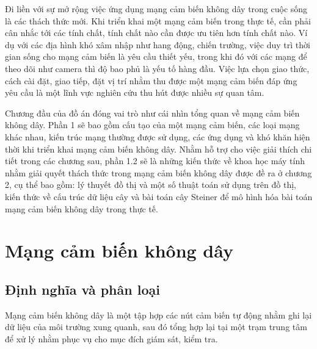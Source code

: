 Đi liền với sự mở rộng việc ứng dụng mạng cảm biến không dây trong cuộc sống là các thách thức mới. Khi triển khai một mạng cảm biến trong thực tế, cần phải cân nhắc tới các tính chất, tính chất nào cần được ưu tiên hơn tính chất nào. Ví dụ với các địa hình khó xâm nhập như hang động, chiến trường, việc duy trì thời gian sống cho mạng cảm biến là yêu cầu thiết yếu, trong khi đó với các mạng để theo dõi như camera thì độ bao phủ là yếu tố hàng đầu. Việc lựa chọn giao thức, cách cài đặt, giao tiếp, đặt vị trí nhằm thu được một mạng cảm biến đáp ứng yêu cầu là một lĩnh vực nghiên cứu thu hút được nhiều sự quan tâm.

 
Chương đầu của đồ án đóng vai trò như cái nhìn tổng quan về mạng cảm biến không dây. Phần 1 sẽ bao gồm cấu tạo của một mạng cảm biến, các loại mạng khác nhau, kiến trúc mạng thường được sử dụng, các ứng dụng và khó khăn hiện thời khi triển khai mạng cảm biến không dây. Nhằm hỗ trợ cho việc giải thích chi tiết trong các chương sau, phần 1.2 sẽ là những kiến thức về khoa học máy tính nhằm giải quyết thách thức trong mạng cảm biến không dây được đề ra ở chương 2, cụ thể bao gồm: lý thuyết đồ thị và một số thuật toán sử dụng trên đồ thị, kiến thức về cấu trúc dữ liệu cây và bài toán cây Steiner để mô hình hóa bài toán mạng cảm biến không dây trong thực tế.

\section{Mạng cảm biến không dây}
\subsection{Định nghĩa và phân loại}
Mạng cảm biến không dây là một tập hợp các nút cảm biến tự động nhằm ghi lại dữ liệu của môi trường xung quanh, sau đó tổng hợp lại tại một trạm trung tâm để xử lý nhằm phục vụ cho mục đích giám sát, kiểm tra.


